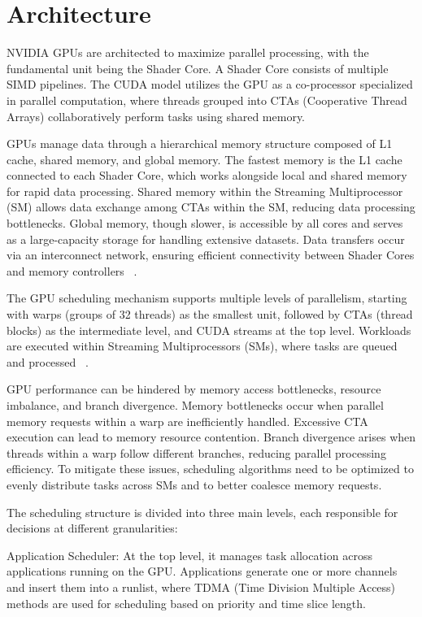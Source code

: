 \section{Architecture}

NVIDIA GPUs are architected to maximize parallel processing, with the fundamental unit being the Shader Core. A Shader Core consists of multiple SIMD pipelines. The CUDA model utilizes the GPU as a co-processor specialized in parallel computation, where threads grouped into CTAs (Cooperative Thread Arrays) collaboratively perform tasks using shared memory.

GPUs manage data through a hierarchical memory structure composed of L1 cache, shared memory, and global memory. The fastest memory is the L1 cache connected to each Shader Core, which works alongside local and shared memory for rapid data processing. Shared memory within the Streaming Multiprocessor (SM) allows data exchange among CTAs within the SM, reducing data processing bottlenecks. Global memory, though slower, is accessible by all cores and serves as a large-capacity storage for handling extensive datasets. Data transfers occur via an interconnect network, ensuring efficient connectivity between Shader Cores and memory controllers ~\cite{Bakhoda2009}.

The GPU scheduling mechanism supports multiple levels of parallelism, starting with warps (groups of 32 threads) as the smallest unit, followed by CTAs (thread blocks) as the intermediate level, and CUDA streams at the top level. Workloads are executed within Streaming Multiprocessors (SMs), where tasks are queued and processed ~\cite{Sanudo2020}.

GPU performance can be hindered by memory access bottlenecks, resource imbalance, and branch divergence. Memory bottlenecks occur when parallel memory requests within a warp are inefficiently handled. Excessive CTA execution can lead to memory resource contention. Branch divergence arises when threads within a warp follow different branches, reducing parallel processing efficiency. To mitigate these issues, scheduling algorithms need to be optimized to evenly distribute tasks across SMs and to better coalesce memory requests.

The scheduling structure is divided into three main levels, each responsible for decisions at different granularities:

Application Scheduler: At the top level, it manages task allocation across applications running on the GPU. Applications generate one or more channels and insert them into a runlist, where TDMA (Time Division Multiple Access) methods are used for scheduling based on priority and time slice length.

